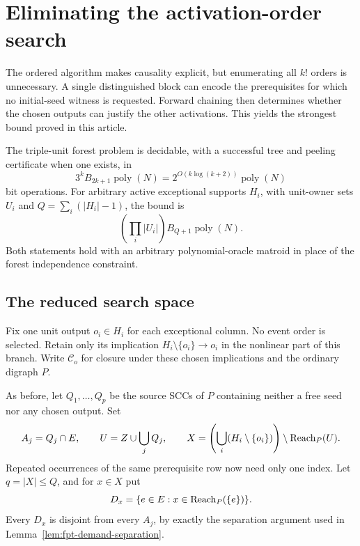 \section{Eliminating the activation-order search}
\label{sec:factorial-free}

The ordered algorithm makes causality explicit, but enumerating all $k!$
orders is unnecessary. A single distinguished block can encode the
prerequisites for which no initial-seed witness is requested. Forward
chaining then determines whether the chosen outputs can justify the other
activations. This yields the strongest bound proved in this article.

\begin{theorem}
\label{thm:factorial-free}
The triple-unit forest problem is decidable, with a successful tree and
peeling certificate when one exists, in
\[
                 3^k B_{2k+1}\operatorname{poly}(N)
                 =2^{O(k\log(k+2))}\operatorname{poly}(N)
\]
bit operations. For arbitrary active exceptional supports $H_i$, with
unit-owner sets $U_i$ and $Q=\sum_i(|H_i|-1)$, the bound is
\[
                 \left(\prod_i |U_i|\right)B_{Q+1}
                 \operatorname{poly}(N).
\]
Both statements hold with an arbitrary polynomial-oracle matroid in place
of the forest independence constraint.
\end{theorem}

\subsection{The reduced search space}

Fix one unit output $o_i\in H_i$ for each exceptional column. No event
order is selected. Retain only its implication
$H_i\setminus\{o_i\}\to o_i$ in the nonlinear part of this branch.
Write $\mathcal C_o$ for closure under these chosen implications and the
ordinary digraph $P$.

As before, let $Q_1,\ldots,Q_p$ be the source SCCs of $P$ containing
neither a free seed nor any chosen output. Set
\[
 A_j=Q_j\cap E,\qquad U=Z\cup\bigcup_j Q_j,
 \qquad
 X=\left(\bigcup_i(H_i\setminus\{o_i\})\right)
                         \setminus\operatorname{Reach}_P(U).
\]
Repeated occurrences of the same prerequisite row now need only one
index. Let $q=|X|\le Q$, and for $x\in X$ put
\[
                         D_x=\{e\in E:x\in\operatorname{Reach}_P(\{e\})\}.
\]
Every $D_x$ is disjoint from every $A_j$, by exactly the separation
argument used in Lemma~\ref{lem:fpt-demand-separation}.

